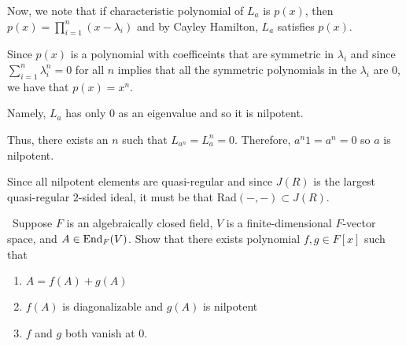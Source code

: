 \documentclass[12pt]{Qual}
\begin{document}
\begin{solution}
\begin{enumerate}[label=(\alph*)]
    Now, we note that if characteristic polynomial of $L_a$ is $p(x)$, then $p(x)=\prod_{i=1}^n(x-\lambda_i)$ and by Cayley Hamilton, $L_a$ satisfies $p(x)$.

    Since $p(x)$ is a polynomial with coefficeints that are symmetric in $\lambda_i$ and since $\sum_{i=1}^n\lambda_i^n=0$ for all $n$ implies that all the symmetric polynomials in the $\lambda_i$ are $0$, we have that $p(x)=x^n$.

    Namely, $L_a$ has only $0$ as an eigenvalue and so it is nilpotent.

    Thus, there exists an $n$ such that $L_{a^n}=L_a^n=0$. Therefore, $a^n1=a^n=0$ so $a$ is nilpotent.

    Since all nilpotent elements are quasi-regular and since $J(R)$ is the largest quasi-regular $2$-sided ideal, it must be that Rad$(-,-)\subset J(R)$.
\end{enumerate}
\end{solution}
\newpage



\begin{problem} $\,$
Suppose $F$ is an algebraically closed field, $V$ is a finite-dimensional $F$-vector space, and $A\in\text{End}_F(V)$. Show that there exists polynomial $f,g\in F[x]$ such that \begin{enumerate}[label=(\roman*)]
    \item $A=f(A)+g(A)$
    \item $f(A)$ is diagonalizable and $g(A)$ is nilpotent
    \item $f$ and $g$ both vanish at $0.$
\end{enumerate}
\end{problem}
\end{document}
